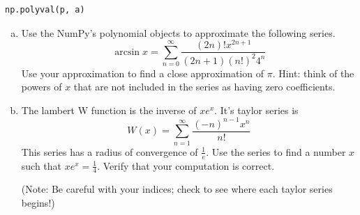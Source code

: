 \begin{lstlisting}
np.polyval(p, a)
\end{lstlisting}

\begin{problem}
\begin{enumerate}[a)]
\item Use the NumPy's polynomial objects to approximate the following series.
\[
\arcsin x = \sum_{n=0}^{\infty} \frac{\left(2 n\right) ! x^{2 n + 1}}{\left(2 n + 1\right)\left(n!\right)^2 4^n}
\]
Use your approximation to find a close approximation of $\pi$. Hint: think of the powers of $x$ that
are not included in the series as having zero coefficients.

\item The lambert W function is the inverse of $x e^x$.
It's taylor series is
\[
W(x) = \sum_{n=1}^{\infty} \frac{\left(-n\right)^{n-1} x^n}{n!}
\]
This series has a radius of convergence of $\frac{1}{e}$.
Use the series to find a number $x$ such that $x e^x = \frac{1}{4}$.
Verify that your computation is correct.

(Note: Be careful with your indices; check to see where each taylor series begins!)
\end{enumerate}
\end{problem}

